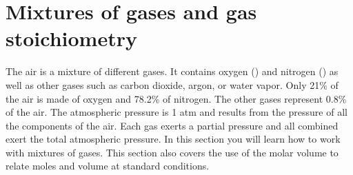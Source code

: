 \documentclass[main.tex]{subfiles}
\begin{document}

\section{Mixtures of gases and gas stoichiometry}
The air is a mixture of different gases. It contains oxygen () and nitrogen () as well as other gases such as carbon dioxide, argon, or water vapor. Only 21\% of the air is made of oxygen and 78.2\% of nitrogen. The other gases represent 0.8\% of the air. The atmospheric pressure is 1 atm and results from the pressure of all the components of the air. Each gas exerts a partial pressure and all combined exert the total atmospheric pressure. In this section you will learn how to work with mixtures of gases. This section also covers the use of the molar volume to relate moles and volume at standard conditions.
\end{document}
